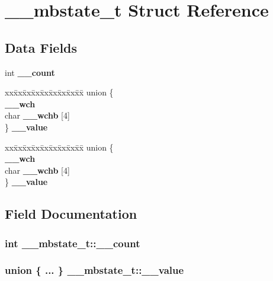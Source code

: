 \section{\_\-\_\-mbstate\_\-t Struct Reference}
\label{struct____mbstate__t}
\subsection*{Data Fields}
\begin{DoxyCompactItemize}
\item 
int {\bf \_\-\_\-count}
\item 
\begin{tabbing}
xx\=xx\=xx\=xx\=xx\=xx\=xx\=xx\=xx\=\kill
union \{\\
 {\bf \_\_wch}\\
\>char {\bf \_\_wchb} [4]\\
\} {\bf \_\_value}\\

\end{tabbing}\item 
\begin{tabbing}
xx\=xx\=xx\=xx\=xx\=xx\=xx\=xx\=xx\=\kill
union \{\\
 {\bf \_\_wch}\\
\>char {\bf \_\_wchb} [4]\\
\} {\bf \_\_value}\\

\end{tabbing}\end{DoxyCompactItemize}


\subsection{Field Documentation}
\subsubsection[{\_\-\_\-count}]{\setlength{\rightskip}{0pt plus 5cm}int {\bf \_\-\_\-mbstate\_\-t::\_\-\_\-count}}\label{struct____mbstate__t_a076c784a64f56f06c9f6719b3fa8cad2}
\subsubsection[{\_\-\_\-value}]{\setlength{\rightskip}{0pt plus 5cm}union \{ ... \}   {\bf \_\-\_\-mbstate\_\-t::\_\-\_\-value}}\label{struct____mbstate__t_aaff71b89e04b4b58966d24701a747cab}
